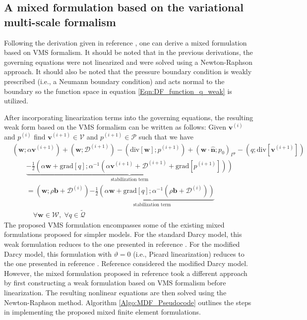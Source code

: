 \documentclass[11pt,reqno]{amsart}
\begin{document}
\subsection{A mixed formulation based on the variational multi-scale formalism}
Following the derivation given in reference 
\cite{Nakshatrala_Turner_Hjelmstad_Masud_CMAME_2006_v195_p4036}, 
one can derive a mixed formulation based on VMS formalism. It 
should be noted that in the previous derivations, the governing 
equations were not linearized and were solved using a Newton-Raphson 
approach. It should also be noted that the pressure boundary 
condition is weakly prescribed (i.e., a Neumann boundary condition) 
and acts normal to the boundary so the function space in equation 
\eqref{Eqn:DF_function_q_weak} is utilized.
 
After incorporating linearization terms into the governing 
equations, the resulting weak form based on the VMS formalism 
can be written as follows: Given $\mathbf{v}^{(i)}$ and $p^{(i)}$ 
find $\mathbf{v}^{(i+1)} \in \mathcal{V}$ and $p^{(i+1)} \in 
\mathcal{P}$ such that we have 
\begin{align}
 & \left(\mathbf{w}; \alpha\mathbf{v}^{(i+1)}\right)
+\left(\mathbf{w}; \mathcal{D}^{(i+1)}\right)
-\left(\mathrm{div}[\mathbf{w}]; p^{(i+1)}\right)
  +\left(\mathbf{w} \cdot \mathbf{\hat{n}}; p_0\right)_{\Gamma^{p}} 
-\left(q; \mathrm{div}[\mathbf{v}^{(i+1)}]\right) \nonumber \\
&\qquad \underbrace{-\frac{1}{2} \left(\alpha \mathbf{w} + \mathrm{grad}[q]; 
  \alpha^{-1}\left(\alpha\mathbf{v}^{(i+1)} + \mathcal{D}^{(i+1)} + \mathrm{grad}[p^{(i+1)}]\right)\right)}_{\mbox{stabilization term}} \nonumber \\
&\qquad = \left(\mathbf{w}; \rho\mathbf{b} +  \mathcal{D}^{(i)}\right) \underbrace{-\frac{1}{2} \left(\alpha \mathbf{w} + \mathrm{grad}[q]; 
  \alpha^{-1}\left(\rho\mathbf{b} + \mathcal{D}^{(i)}\right)\right)}_{\mbox{stabilization term}} \nonumber \\
&\qquad\quad \forall \mathbf{w} \in \mathcal{W}, \; 
  \forall q \in \widetilde{\mathcal{Q}}
\end{align}
The proposed VMS formulation encompasses some of the 
existing mixed formulations proposed for simpler 
models. For the standard Darcy model, this weak 
formulation reduces to the one presented in reference 
\cite{Nakshatrala_Turner_Hjelmstad_Masud_CMAME_2006_v195_p4036}.
For the modified Darcy model, this formulation 
with $\vartheta = 0$ (i.e., Picard linearization) 
reduces to the one presented in reference 
\cite{Nakshatrala_Turner_2013_arXiv}. 
Reference \cite{Nakshatrala_Rajagopal_IJNMF_2011_v67_p342} 
considered the modified Darcy model. However, the mixed 
formulation proposed in reference 
\cite{Nakshatrala_Rajagopal_IJNMF_2011_v67_p342} 
took a different approach by first constructing 
a weak formulation based on VMS formalism before 
linearization. The resulting nonlinear equations 
are then solved using the Newton-Raphson method. 
Algorithm \ref{Algo:MDF_Pseudocode} outlines 
the steps in implementing the proposed mixed 
finite element formulations. 
\end{document}
